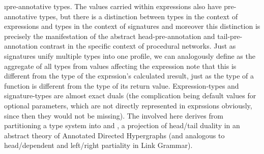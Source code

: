 {\i{pre-annotative} types.  The values carried
within expressions also have pre-annotative types,
but there is a distinction between types in the context
of expressions and types in the context of signatures
\mdash{} and moreover this distinction is precisely the
manifestation of the abstract head-pre-annotation
and tail-pre-annotation contrast in the specific
context of procedural networks.  Just as
signatures unify multiple types into one
profile, we can analogously define
 as the aggregate of all types
from values affecting the expression \mdash{} note that
this is different from the type of the exprssion's
calculated \i{result}, just as the type of
a function is different from the type of its
return value.  Expression-types and signature-types
are almost exact duals (the complication being
default values for optional parameters, which
are not directly represented in exprssions
\mdash{} obviously, since then they would not be
missing).  The  involved here
derives from partitioning a type system into
 and
, a projection
of head/tail duality in an abstract theory
of Annotated Directed Hypergraphs
(and analogous to head/dependent
and left/right partiality in Link Grammar).
}
\p{}

